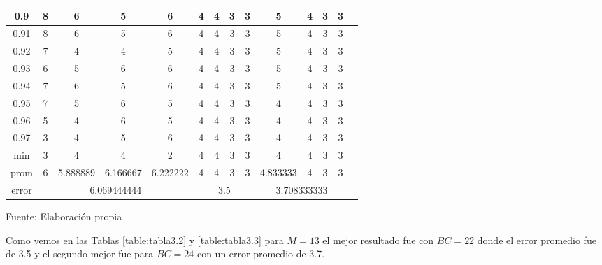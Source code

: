 \begin{center}
\begin{table}[H]
{\begin{tabular}{|c|c|c|c|c|c|c|c|c|c|c|c|c|c|}
\hline 
0.9 & 
8 & 6 & 5 & 6 & 4 & 4 & 3 & 3 & 5 & 4 & 3 & 3 \\
\hline 
0.91 & 
8 & 6 & 5 & 6 & 4 & 4 & 3 & 3 & 5 & 4 & 3 & 3 \\
\hline 
0.92 & 
7 & 4 & 4 & 5 & 4 & 4 & 3 & 3 & 5 & 4 & 3 & 3 \\
\hline 
0.93 & 
6 & 5 & 6 & 6 & 4 & 4 & 3 & 3 & 5 & 4 & 3 & 3 \\
\hline 
0.94 & 
7 & 6 & 5 & 6 & 4 & 4 & 3 & 3 & 5 & 4 & 3 & 3 \\
\hline 
0.95 & 
7 & 5 & 6 & 5 & 4 & 4 & 3 & 3 & 4 & 4 & 3 & 3 \\
\hline 
0.96 & 
5 & 4 & 6 & 5 & 4 & 4 & 3 & 3 & 4 & 4 & 3 & 3 \\
\hline 
0.97 & 
3 & 4 & 5 & 6 & 4 & 4 & 3 & 3 & 4 & 4 & 3 & 3 \\
\hline 
min & 
3 & 4 & 4 & 2 & 4 & 4 & 3 & 3 & 4 & 4 & 3 & 3 \\
\hline 
prom & 
6 & 5.888889 & 6.166667 & 6.222222 & 4 & 4 & 3 & 3 & 4.833333 & 4 & 3 & 3 \\
\hline 
error & 
\multicolumn{4}{c|}{6.069444444} & 
\multicolumn{4}{c|}{3.5} & 
\multicolumn{4}{c|}{3.708333333}\\ 
\hline 
\end{tabular} 
}
\begin{center}
\vskip 0.2cm
{\small{Fuente: Elaboración propia}}
\end{center}
\end{table}
\end{center}

\vskip -0.5cm
Como vemos en las Tablas \ref{table:tabla3.2} y \ref{table:tabla3.3} para $M = 13$ el mejor resultado fue con $BC = 22$ donde el error promedio fue de 3.5 y el segundo mejor fue para $BC = 24$ con un error promedio de 3.7.
\vskip -0.5cm

